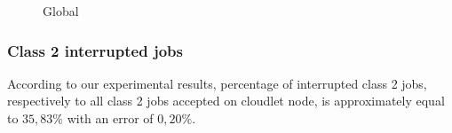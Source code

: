 \documentclass[10pt,a4paper]{article}
\begin{document}
\begin{figure}[h!]
    \centering
    \caption{Global}%
\end{figure}
\restoregeometry 


\subsubsection{Class 2 interrupted jobs}

According to our experimental results, percentage of interrupted class 2 jobs, respectively to all class 2 jobs accepted on cloudlet node, is approximately equal to $35,83\%$ with an error of $0,20\%$.
\end{document}
